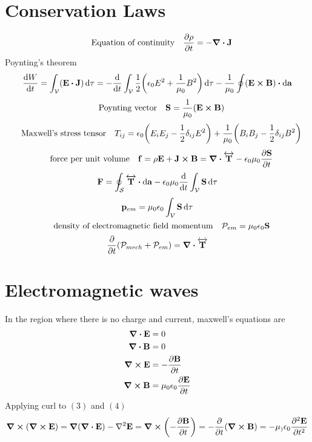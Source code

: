 \documentclass[12pt]{article}
\begin{document}
\section{Conservation Laws}
\[\qq{Equation of continuity} \pdv{\rho}{t}=-\div{\vb{J}}\]
Poynting's theorem
\[\dv{W}{t}=\int_{\mathcal{V}}(\vb{E}\vdot{\vb{J}})\dd{\tau}=-\dv{t}\int_{\mathcal{V}}\frac{1}{2}\qty(\epsilon_0E^2+\frac{1}{\mu_0}B^2)\dd{\tau}-\frac{1}{\mu_0}\oint(\vb{E}\cp\vb{B})\vdot\dd{\vb{a}}\]
\[\qq{Poynting vector}\vb{S}=\frac{1}{\mu_0}(\vb{E}\cp\vb{B})\]
\[\qq{Maxwell's stress tensor} T_{ij}=\epsilon_0\qty(E_iE_j-\frac{1}{2}\delta_{ij}E^2)+\frac{1}{\mu_0}\qty(B_iB_j-\frac{1}{2}\delta_{ij}B^2)\]
\[\qq{force per unit volume} \vb{f}=\rho\vb{E}+\vb{J}\cp\vb{B}=\div{\overleftrightarrow{\vb{T}}}-\epsilon_0\mu_0\pdv{\vb{S}}{t}\]
\[\vb{F}=\oint_{\mathcal{S}}\overleftrightarrow{\vb{T}}\vdot\dd{\vb{a}}-\epsilon_0\mu_0\dv{t}\int_{\mathcal{V}}\vb{S}\dd{\tau}\]
\[\vb{p}_{em}=\mu_0\epsilon_0\int_{\mathcal{V}}\vb{S}\dd{\tau}\]
\[\qq{density of electromagnetic field momentum}\mathcal{P}_{em}=\mu_0\epsilon_0\vb{S}\]
\[\pdv{t}(\mathcal{P}_{mech}+\mathcal{P}_{em})=\div{\overleftrightarrow{\vb{T}}}\]
\section{Electromagnetic waves}
In  the region where there is no charge and current, maxwell's equations are 
\begin{align}
\div{\vb{E}}&=0\\
\div{\vb{B}}&=0\\
\curl{\vb{E}}&=-\pdv{\vb{B}}{t}\\
\curl{\vb{B}}&=\mu_0\epsilon_0\pdv{\vb{E}}{t}
\end{align}
Applying curl to $(3)$ and $(4)$ 
\[\curl{\qty(\curl{\vb{E}})}=\grad{\qty(\div{\vb{E}})}-\laplacian{\vb{E}}=\curl{\qty(-\pdv{\vb{B}}{t})}=-\pdv{t}\qty(\curl{\vb{B}})=-\mu_)\epsilon_0\pdv[2]{\vb{E}}{t}\]
\end{document}
